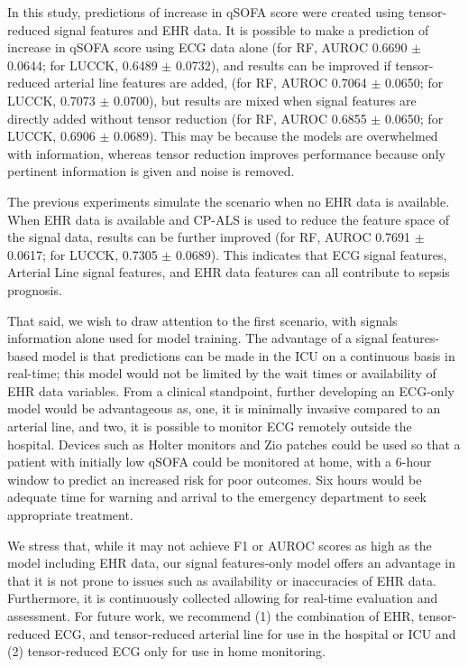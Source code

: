 
In this study, predictions of increase in qSOFA score were created using tensor-reduced signal features and EHR data. It is possible to make a prediction of increase in qSOFA score using ECG data alone (for RF, AUROC 0.6690 $\pm$ 0.0644; for LUCCK, 0.6489 $\pm$ 0.0732), and results can be improved if tensor-reduced arterial line features are added, (for RF, AUROC 0.7064 $\pm$ 0.0650; for LUCCK, 0.7073 $\pm$ 0.0700), but results are mixed when signal features are directly added without tensor reduction (for RF, AUROC 0.6855 $\pm$ 0.0650; for LUCCK, 0.6906 $\pm$ 0.0689). This may be because the models are overwhelmed with information, whereas tensor reduction improves performance because only pertinent information is given and noise is removed. 

The previous experiments simulate the scenario when no EHR data is available. When EHR data is available and CP-ALS is used to reduce the feature space of the signal data, results can be further improved (for RF, AUROC 0.7691 $\pm$ 0.0617; for LUCCK, 0.7305 $\pm$ 0.0689). This indicates that ECG signal features, Arterial Line signal features, and EHR data features can all contribute to sepsis prognosis. 

That said, we wish to draw attention to the first scenario, with signals information alone used for model training. The advantage of a signal features-based model is that predictions can be made in the ICU on a continuous basis in real-time; this model would not be limited by the wait times or availability of EHR data variables. From a clinical standpoint, further developing an ECG-only model would be advantageous as, one, it is minimally invasive compared to an arterial line, and two, it is possible to monitor ECG remotely outside the hospital. Devices such as Holter monitors and Zio patches could be used so that a patient with initially low qSOFA could be monitored at home, with a 6-hour window to predict an increased risk for poor outcomes. Six hours would be adequate time for warning and arrival to the emergency department to seek appropriate treatment.

We stress that, while it may not achieve F1 or AUROC scores as high as the model including EHR data, our signal features-only model offers an advantage in that it is not prone to issues such as availability or inaccuracies of EHR data. Furthermore, it is continuously collected allowing for real-time evaluation and assessment. For future work, we recommend (1) the combination of EHR, tensor-reduced ECG, and tensor-reduced arterial line for use in the hospital or ICU and (2) tensor-reduced ECG only for use in home monitoring.